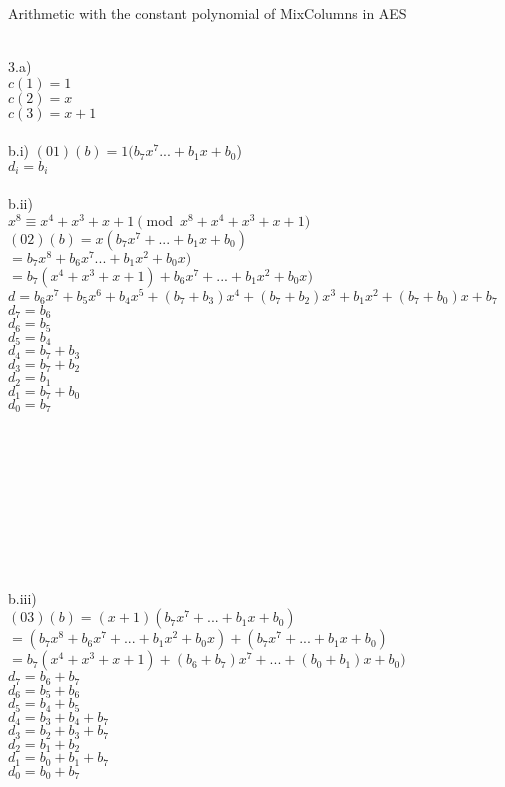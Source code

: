 \documentclass{assignment}
\begin{document}
\begin{problemlist}
\pbitem Arithmetic with the constant polynomial of MixColumns in AES
\begin{problem}
\begin{answer}
\\
3.a)\\
$c(1)=1$\\
$c(2)=x$\\
$c(3)=x+1$\\
\\
b.i)   
$(01)(b)=1(b_7x^7...+b_1x+b_0$)\\
$d_i=b_i$\\
\\
b.ii)\\
$x^8\equiv x^4+x^3+x+1 \pmod {x^8+x^4+x^3+x+1}$\\
$(02)(b)=x(b_7x^7+...+b_1x+b_0)$\\
$=b_7x^8+b_6x^7...+b_1x^2+b_0x)$\\
$=b_7(x^4+x^3+x+1)+b_6x^7+...+b_1x^2+b_0x)$\\
$d=b_6x^7+b_5x^6+b_4x^5+(b_7+b_3)x^4+(b_7+b_2)x^3+b_1x^2+(b_7+b_0)x+b_7$\\
$d_7=b_6$\\
$d_6=b_5$\\
$d_5=b_4$\\
$d_4=b_7+b_3$\\
$d_3=b_7+b_2$\\
$d_2=b_1$\\
$d_1=b_7+b_0$\\
$d_0=b_7$\\
\\
\\
\\
\\
\\
\\
\\
\\
\\
b.iii)\\
$(03)(b)=(x+1)(b_7x^7+...+b_1x+b_0)$\\
$=(b_7x^8+b_6x^7+...+b_1x^2+b_0x)+(b_7x^7+...+b_1x+b_0)$\\
$=b_7(x^4+x^3+x+1)+(b_6+b_7)x^7+...+(b_0+b_1)x+b_0)$\\
$d_7=b_6+b_7$\\
$d_6=b_5+b_6$\\
$d_5=b_4+b_5$\\
$d_4=b_3+b_4 +b_7$\\
$d_3=b_2+b_3 +b_7$\\
$d_2=b_1+b_2$\\
$d_1=b_0+b_1 +b_7$\\
$d_0=b_0 +b_7$\\


\end{answer}
\end{problem}
\end{problemlist}
\end{document}
